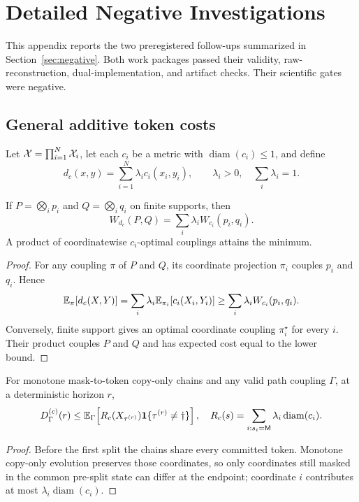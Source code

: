 \section{Detailed Negative Investigations}
\label{app:negative}

This appendix reports the two preregistered follow-ups summarized in Section~\ref{sec:negative}. Both work packages passed their validity, raw-reconstruction, dual-implementation, and artifact checks. Their scientific gates were negative.

\subsection{General additive token costs}
Let $\mathcal{X}=\prod_{i=1}^N\mathcal{X}_i$, let each $c_i$ be a metric with $\operatorname{diam}(c_i)\le1$, and define
\[
d_c(x,y)=\sum_{i=1}^N\lambda_i c_i(x_i,y_i),
\qquad \lambda_i>0,\quad \sum_i\lambda_i=1.
\]

\begin{theorem}
\label{thm:general-additive}
If $P=\bigotimes_i p_i$ and $Q=\bigotimes_i q_i$ on finite supports, then
\[
W_{d_c}(P,Q)=\sum_i\lambda_iW_{c_i}(p_i,q_i).
\]
A product of coordinatewise $c_i$-optimal couplings attains the minimum.
\end{theorem}
\begin{proof}
For any coupling $\pi$ of $P$ and $Q$, its coordinate projection $\pi_i$ couples $p_i$ and $q_i$. Hence
\[
\mathbb{E}_\pi[d_c(X,Y)]
=\sum_i\lambda_i\mathbb{E}_{\pi_i}[c_i(X_i,Y_i)]
\ge\sum_i\lambda_iW_{c_i}(p_i,q_i).
\]
Conversely, finite support gives an optimal coordinate coupling $\pi_i^\star$ for every $i$. Their product couples $P$ and $Q$ and has expected cost equal to the lower bound.
\end{proof}

\begin{corollary}
\label{cor:general-additive-fs}
For monotone mask-to-token copy-only chains and any valid path coupling $\Gamma$, at a deterministic horizon $r$,
\[
D_\Gamma^{(c)}(r)
\le \mathbb{E}_\Gamma\!\left[R_c(X_{\tau^{(r)}})\mathbf{1}\{\tau^{(r)}\ne\dagger\}\right],
\quad
R_c(s)=\sum_{i:s_i=\mathsf{M}}\lambda_i\operatorname{diam}(c_i).
\]
\end{corollary}
\begin{proof}
Before the first split the chains share every committed token. Monotone copy-only evolution preserves those coordinates, so only coordinates still masked in the common pre-split state can differ at the endpoint; coordinate $i$ contributes at most $\lambda_i\operatorname{diam}(c_i)$.
\end{proof}

